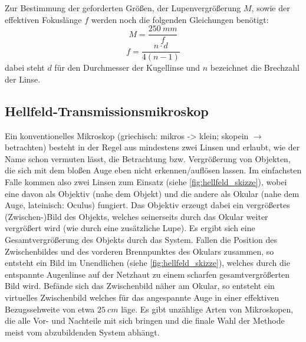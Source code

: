 \documentclass[ngerman]{scrartcl}
\begin{document}
Zur Bestimmung der geforderten Größen, der Lupenvergrößerung $M$, sowie der effektiven Fokuslänge $f$ werden noch die folgenden Gleichungen benötigt:
\begin{equation}
    \label{eq:vergroesserung_leeuwenhoek}
    M = \frac{\SI{250}{mm}}{f}
\end{equation}
\begin{equation}
    \label{eq:fokuslaenge_leeuwenhoek}
    f = \frac{n \cdot d}{4(n-1)}
\end{equation}
dabei steht $d$ für den Durchmesser der Kugellinse und $n$ bezeichnet die Brechzahl der Linse. 

\subsection{Hellfeld-Transmissionsmikroskop}
\label{subsec:hellfeld_transmissionsmikroskop_grundlagen}
Ein konventionelles Mikroskop (griechisch: mikros -> \glq klein\grq; skopein $\rightarrow$ \glq betrachten\grq) besteht in der Regel aus mindestens zwei Linsen und erlaubt, wie der Name schon vermuten lässt, die Betrachtung bzw. Vergrößerung von Objekten, die sich mit dem bloßen Auge eben nicht erkennen/auflösen lassen. Im einfachsten Falle kommen also zwei Linsen zum Einsatz (siehe \autoref{fig:hellfeld_skizze}), wobei eine davon als Objektiv (nahe dem Objekt) und die andere als Okular (nahe dem Auge, lateinisch: Oculus) fungiert. Das Objektiv erzeugt dabei ein vergrößertes (Zwischen-)Bild des Objekts, welches seinerseits durch das Okular weiter vergrößert wird (wie durch eine zusätzliche Lupe). Es ergibt sich eine Gesamtvergrößerung des Objekts durch das System. Fallen die Position des Zwischenbildes und des vorderen Brennpunktes des Okulars zusammen, so entsteht ein Bild im Unendlichen (siehe \autoref{fig:hellfeld_skizze}), welches durch die entspannte Augenlinse auf der Netzhaut zu einem scharfen gesamtvergrößerten Bild wird. Befände sich das Zwischenbild näher am Okular, so entsteht ein virtuelles Zwischenbild welches für das angespannte Auge in einer effektiven Bezugssehweite von etwa $\SI{25}{cm}$ läge. Es gibt unzählige Arten von Mikroskopen, die alle Vor- und Nachteile mit sich bringen und die finale Wahl der Methode meist vom abzubildenden System abhängt.
\end{document}
